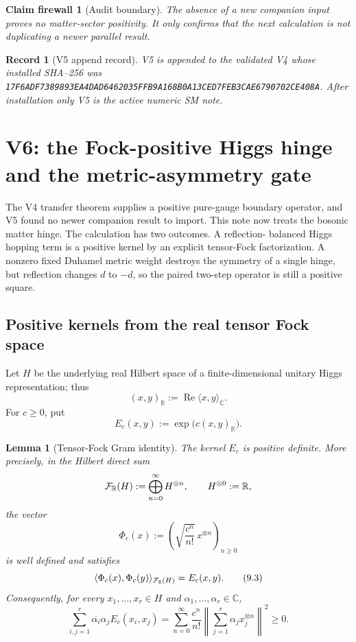 \documentclass[11pt]{article}
\newtheorem{lemma}[theorem]{Lemma}
\newtheorem{firewall}[theorem]{Claim firewall}
\newtheorem{record}[theorem]{Record}
\theoremstyle{remark}
\begin{document}
\begin{firewall}[Audit boundary]
\label{fire:v19v5}
The absence of a new companion input proves no matter-sector positivity.
It only confirms that the next calculation is not duplicating a newer
parallel result.
\end{firewall}

\begin{record}[V5 append record]
\label{rec:v19v5}
V5 is appended to the validated V4 whose installed SHA--256 was
\texttt{17F6ADF7389893EA4DAD6462035FFB9A168B0A13CED7FEB3CAE6790702CE408A}.
After installation only V5 is the active numeric SM note.
\end{record}


\section{V6: the Fock-positive Higgs hinge and the metric-asymmetry gate}
\label{sec:v19v6}

The V4 transfer theorem supplies a positive pure-gauge boundary operator, and
V5 found no newer companion result to import.  This note now treats the
bosonic matter hinge.  The calculation has two outcomes.  A reflection-
balanced Higgs hopping term is a positive kernel by an explicit tensor-Fock
factorization.  A nonzero fixed Duhamel metric weight destroys the symmetry
of a single hinge, but reflection changes \(d\) to \(-d\), so the paired
two-step operator is still a positive square.

\subsection{Positive kernels from the real tensor Fock space}

Let \(H\) be the underlying real Hilbert space of a finite-dimensional
unitary Higgs representation; thus
\[
 (x,y)_{\mathbb R}:=\operatorname{Re}\langle x,y\rangle_{\mathbb C}.
\]
For \(c\geq0\), put
\[
 E_c(x,y):=\exp\!\big(c(x,y)_{\mathbb R}\big).                 \tag{9.1}
\]

\begin{lemma}[Tensor-Fock Gram identity]
\label{lem:v19v6-fock}
The kernel \(E_c\) is positive definite.  More precisely, in the Hilbert
direct sum
\[
 {\cal F}_{\mathbb R}(H):=\bigoplus_{n=0}^{\infty}H^{\otimes n},
 \qquad H^{\otimes0}:=\mathbb R,
\]
the vector
\[
 \Phi_c(x):=\left(\sqrt{\frac{c^n}{n!}}\,x^{\otimes n}\right)_{n\geq0}
                                                               \tag{9.2}
\]
is well defined and satisfies
\[
 \langle\Phi_c(x),\Phi_c(y)\rangle_{{\cal F}_{\mathbb R}(H)}
 =E_c(x,y).                                                    \tag{9.3}
\]
Consequently, for every \(x_1,\ldots,x_r\in H\) and
\(\alpha_1,\ldots,\alpha_r\in\mathbb C\),
\[
 \sum_{i,j=1}^r\overline{\alpha_i}\alpha_j E_c(x_i,x_j)
 =\sum_{n=0}^{\infty}\frac{c^n}{n!}
   \left\|\sum_{j=1}^r\alpha_jx_j^{\otimes n}\right\|^2
 \geq0.                                                       \tag{9.4}
\]
\end{lemma}
\end{document}
